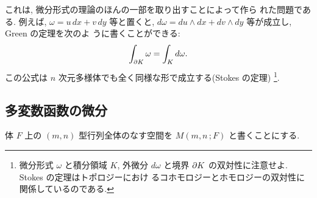 \documentclass[12pt,twoside]{jarticle}
\begin{document}
\noindent これは, 微分形式の理論のほんの一部を取り出すことによって作ら
れた問題である. 例えば, $\omega=u\,dx+v\,dy$ 等と置くと, %
$d\omega=du \wedge dx + dv\wedge dy$ 等が成立し, Green の定理を次のよ
うに書くことができる:
\[
  \int_{\partial K} \omega = \int_K d\omega.
\]%
この公式は $n$ 次元多様体でも全く同様な形で成立する(Stokes の定理)%
\footnote{微分形式 $\omega$ と積分領域 $K$, 外微分 $d\omega$ と境界 
  $\partial K$ の双対性に注意せよ. Stokes の定理はトポロジーにおけ
  るコホモロジーとホモロジーの双対性に関係しているのである.}.
%


\subsection{多変数函数の微分}

体 $F$ 上の $(m,n)$ 型行列全体のなす空間を $M(m,n\,;F)$ と書くことにする.
\end{document}
